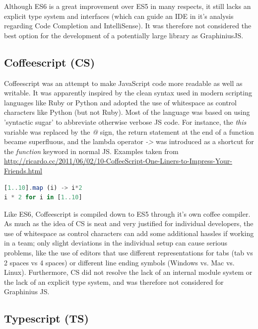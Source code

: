 	Although ES6 is a great improvement over ES5 in many respects, it still lacks an explicit type system and interfaces (which can guide an IDE in it's analysis regarding Code Completion and IntelliSense). It was therefore not considered the best option for the development of a potentially large library as GraphiniusJS.			
	
	\subsection{Coffeescript (CS)}
	\label{ssect:coffeescript}
	
	Coffeescript was an attempt to make JavaScript code more readable as well as writable. It was apparently inspired by the clean syntax used in modern scripting languages like Ruby or Python and adopted the use of whitespace as control characters like Python (but not Ruby). Most of the language was based on using 'syntactic sugar' to abbreviate otherwise verbose JS code. For instance, the  \textit{this} variable was replaced by the  \textit{@} sign, the return statement at the end of a function became superfluous, and the lambda operator \textit{->} was introduced as a shortcut for the \textit{function} keyword in normal JS. Examples taken from \url{http://ricardo.cc/2011/06/02/10-CoffeeScript-One-Liners-to-Impress-Your-Friends.html}
	
	\begin{lstlisting}[caption={Two versions of the same mapping functionality in CoffeeScript}, label={fig:Coffeescript_mapping}, language=JavaScript]
[1..10].map (i) -> i*2
i * 2 for i in [1..10]
	\end{lstlisting}
	
	Like ES6, Coffeescript is compiled down to ES5 through it's own coffee compiler. As much as the idea of CS is neat and very justified for individual developers, the use of whitespace as control characters can add some additional hassles if working in a team; only slight deviations in the individual setup can cause serious problems, like the use of editors that use different representations for tabs (tab vs 2 spaces vs 4 spaces) or different line ending symbols (Windows vs. Mac vs. Linux). Furthermore, CS did not resolve the lack of an internal module system or the lack of an explicit type system, and was therefore not considered for Graphinius JS.
	
	
	\subsection{Typescript (TS)}
	\label{ssect:typescript}
	
